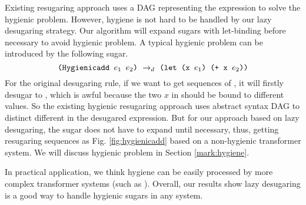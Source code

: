 Existing resugaring approach \cite{hygienic} uses a DAG representing the expression to solve the hygienic problem. However, hygiene is not hard to be handled by our lazy desugaring strategy. Our algorithm will expand sugars with let-binding before necessary to avoid hygienic problem.
A typical hygienic problem can be introduced by the following sugar.
\[
\texttt{(Hygienicadd $e_1$ $e_2$)} ~\rightarrow_d~ \texttt{(let (x $e_1$) (+ x $e_2$))}
\]
For the original desugaring rule, if we want to get sequences of , it will firstly desugar to , which is awful because the two $x$ in  should be bound to different values. So the existing hygienic resugaring approach uses abstract syntax DAG to distinct different  in the desugared expression. But for our approach based on lazy desugaring, the  sugar does not have to expand until necessary, thus, getting resugaring sequences as Fig.  \ref{fig:hygienicadd} based on a non-hygienic transformer system. We will discuss hygienic problem in Section \ref{mark:hygiene}.



In practical application, we think hygiene can be easily processed by more complex transformer systems (such as \cite{10.5555/1792878.1792884}). Overall, our results show lazy desugaring is a good way to handle hygienic sugars in any system.

